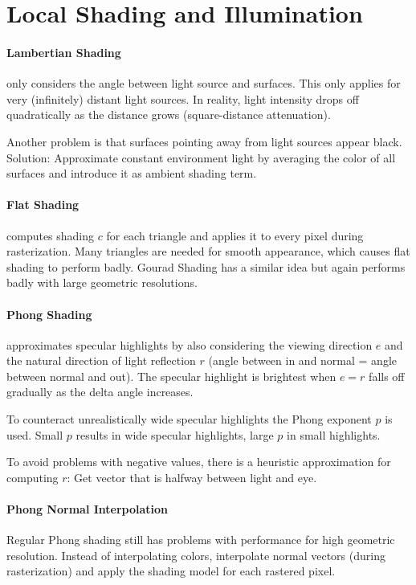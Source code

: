\documentclass{article}
\begin{document}
\section{Local Shading and Illumination}

\paragraph{Lambertian Shading} only considers the angle between light source and surfaces. This only applies for very (infinitely) distant light sources. In reality, light intensity drops off quadratically as the distance grows (square-distance attenuation).

Another problem is that surfaces pointing away from light sources appear black. Solution: Approximate constant environment light by averaging the color of all surfaces and introduce it as ambient shading term.

\paragraph{Flat Shading} computes shading $c$ for each triangle and applies it to every pixel during rasterization. Many triangles are needed for smooth appearance, which causes flat shading to perform badly. Gourad Shading has a similar idea but again performs badly with large geometric resolutions.

\paragraph{Phong Shading} approximates specular highlights by also considering the viewing direction $e$ and the natural direction of light reflection $r$ (angle between in and normal = angle between normal and out). The specular highlight is brightest when $e = r$ falls off gradually as the delta angle increases.

To counteract unrealistically wide specular highlights the Phong exponent $p$ is used. Small $p$ results in wide specular highlights, large $p$ in small highlights.

To avoid problems with negative values, there is a heuristic approximation for computing $r$: Get vector that is halfway between light and eye.

\paragraph{Phong Normal Interpolation} Regular Phong shading still has problems with performance for high geometric resolution. Instead of interpolating colors, interpolate normal vectors (during rasterization) and apply the shading model for each rastered pixel.
\end{document}

